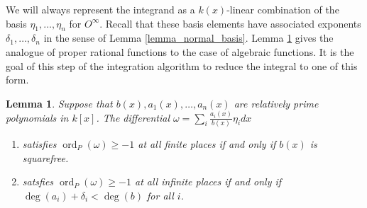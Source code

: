 \documentclass[12pt,reqno]{amsart}
\numberwithin{equation}{section}
\newtheorem{lemma}[theorem]{Lemma}
\newcommand{\op}[1]  { \operatorname{ #1 }}
\begin{document}
We will always represent the integrand as a $k(x)$-linear combination of the basis $\eta_1,\dots,\eta_n$ for $O^{\infty}$. Recall that these basis elements have associated exponents $\delta_1,\dots,\delta_n$ in the sense of Lemma \ref{lemma_normal_basis}. Lemma \ref{lemma_simple} gives the analogue of proper rational functions to the case of algebraic functions. It is the goal of this step of the integration algorithm to reduce the integral to one of this form.

\begin{lemma}
\label{lemma_simple}
Suppose that $b(x),a_1(x),\dots,a_n(x)$ are relatively prime polynomials in $k[x]$. The differential $ \omega = \sum_i \frac{a_i(x)}{b(x)} \eta_i dx$
\begin{enumerate}
 \item satisfies $\operatorname{ord}_{P}(\omega) \ge -1$ at all finite places if and only if $b(x)$ is squarefree.
 \item satsfies $\op{ord}_{P}(\omega) \ge -1$ at all infinite places if and only if $\op{deg}(a_i) + \delta_i < \op{deg}(b)$ for all $i$.
\end{enumerate}
\end{lemma}
\end{document}
